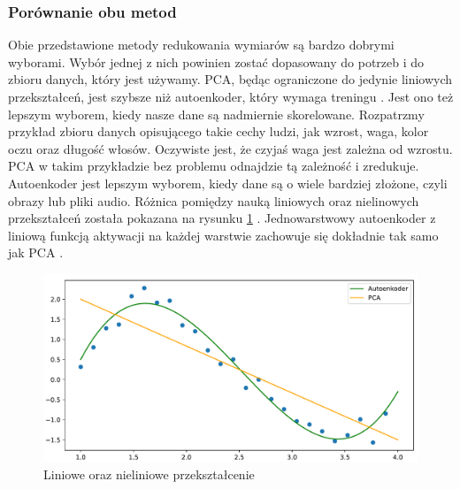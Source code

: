 \documentclass[a4paper,12pt,oneside]{book} %
\begin{document}
\subsubsection{Porównanie obu metod}
Obie przedstawione metody redukowania wymiarów są bardzo dobrymi wyborami. Wybór jednej z nich powinien zostać dopasowany do potrzeb i do zbioru danych, który jest używamy. PCA, będąc ograniczone do jedynie liniowych przekształceń, jest szybsze niż autoenkoder, który wymaga treningu \cite{aevspca2}. Jest ono też lepszym wyborem, kiedy nasze dane są nadmiernie skorelowane. Rozpatrzmy przykład zbioru danych opisującego takie cechy ludzi, jak wzrost, waga, kolor oczu oraz długość włosów. Oczywiste jest, że czyjaś waga jest zależna od wzrostu. PCA w takim przykładzie bez problemu odnajdzie tą zależność i zredukuje. Autoenkoder jest lepszym wyborem, kiedy dane są o wiele bardziej złożone, czyli obrazy lub pliki audio. Różnica pomiędzy nauką liniowych oraz nielinowych przekształceń została pokazana na rysunku \ref{fig:pcavsautoenkoder} \cite{nonlinearpca}.  
Jednowarstwowy autoenkoder z liniową funkcją aktywacji na każdej warstwie zachowuje się dokładnie tak samo jak PCA \cite{aevspca}.
\begin{figure}[h!]
	\centering
	\includegraphics[width=14cm]{pcavsautoencoder.pdf}
	\caption{Liniowe oraz nieliniowe przekształcenie}
	\label{fig:pcavsautoenkoder}
\end{figure}
\end{document}
